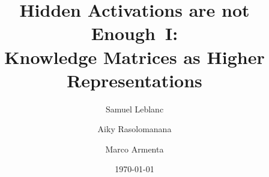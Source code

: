 \documentclass[11pt,a4paper]{article}
\title{Hidden Activations are not Enough~I:\\ Knowledge Matrices as Higher Representations}
\author{Samuel Leblanc \and Aiky Rasolomanana \and Marco Armenta}
\date{\today}
\begin{document}
\maketitle






\appendix








\providecommand{\vocabdir}{sections/vocab}




\end{document}
